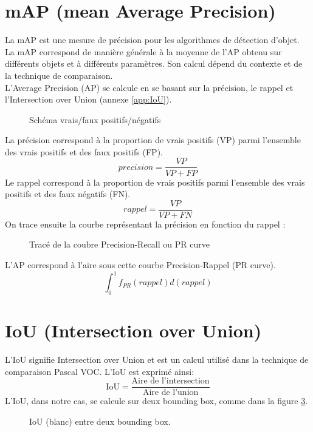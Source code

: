 \begin{appendices}
	
\section*{mAP (mean Average Precision)}\label{app:mAP}
La mAP est une mesure de précision pour les algorithmes de détection d'objet. La mAP correspond de manière générale à la moyenne de l'AP obtenu sur différents objets et à différents paramètres. Son calcul dépend du contexte et de la technique de comparaison.\\
L'Average Precision (AP) se calcule en se basant sur la précision, le rappel et l'Intersection over Union (annexe \ref{app:IoU}). 
\begin{figure}[!htbp]
\center
\caption{Schéma vrais/faux positifs/négatifs}
\label{fig:schema_vraifaux}
\end{figure}
\FloatBarrier
La précision correspond à la proportion de vrais positifs (VP) parmi l'ensemble des vrais positifs et des faux positifs (FP). 
$$precision = \frac{VP}{VP+FP}$$
Le rappel correspond à la proportion de vrais positifs parmi l'ensemble des vrais positifs et des faux négatifs (FN).
$$rappel = \frac{VP}{VP+FN}$$
On trace ensuite la courbe représentant la précision en fonction du rappel : 
\begin{figure}[!htbp]
\center
\caption{Tracé de la coubre Precision-Recall ou PR curve}
\label{fig:trace_prcurve}
\end{figure}
\FloatBarrier
L'AP correspond à l'aire sous cette courbe Precision-Rappel (PR curve). 
$$\int_{0}^{1} f_{PR}(rappel)d(rappel)$$
	
	
	
	
\section*{IoU (Intersection over Union)}\label{app:IoU}
L'IoU signifie Intersection over Union et est un calcul utilisé dans la technique de comparaison Pascal VOC.
L'IoU est exprimé ainsi:
$$\text{IoU} = \frac{\text{Aire de l'intersection}}{\text{Aire de l'union}}$$
L'IoU, dans notre cas, se calcule sur deux bounding box, comme dans la figure \ref{fig:iou_example}.
\begin{figure}[!htbp]
\center
\caption{IoU (blanc) entre deux bounding box.}
\label{fig:iou_example}
\end{figure}
\FloatBarrier
	

\end{appendices}
